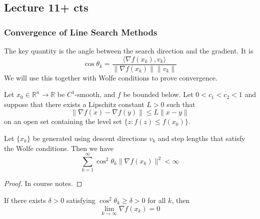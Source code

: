 \subsection{Lecture 11+ cts}
\subsubsection{Convergence of Line Search Methods}
\begin{definition}
    The key quantity is the angle between the search direction and the gradient. It is
    $$\cos \theta_k = \frac{\langle \nabla f(x_k), v_k \rangle}{\| \nabla f(x_k) \| \| v_k \|}$$
    We will use this together with Wolfe conditions to prove convergence.
\end{definition}
\begin{theorem}
    Let $x_0 \in \mathbb R^n \to \mathbb R$ be $C^1$-smooth, and $f$ be bounded below. Let $0 < c_1 < c_2 < 1$ and suppose that there exists a Lipschitz constant $L > 0$ such that $$ \| \nabla f(x) - \nabla f(y) \| \leq L \| x - y \|$$
    on an open set containing the level set $\{z: f(z) \leq f(x_0)\}$.

    Let $\{x_k\}$ be generated using descent directions $v_k$ and step lengths that satisfy the Wolfe conditions. Then we have
    $$\sum^\infty_{k=1} \cos^2 \theta_k \|\nabla f(x_k) \|^2 < \infty$$
\end{theorem}
\begin{proof}[Proof]
    In course notes.
\end{proof}
\begin{corollary}
    If there exists $\delta > 0$ satisfying $\cos^2 \theta_k \geq \delta > 0$ for all $k$, then 
    $$\lim_{k \to \infty} \nabla f(x_k) = 0$$
\end{corollary}

